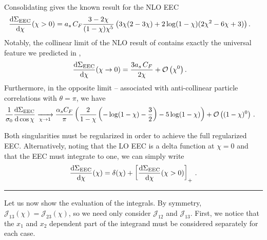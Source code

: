 Consolidating gives the known result for the NLO EEC \cite{Basham:1978bw}
\begin{align}
    \label{eq:ee_to_hadrons_eec_nlo}
    \frac{\dd\Sigma_\text{EEC}}{\dd\chi}(\chi>0)
    &=
    \ascf
    \frac{3-2\chi}{(1-\chi)\chi^5}
    \le(
        3 \chi (2 - 3 \chi)
        +
        2 \log(1 - \chi) (2 \chi^2 - 6 \chi + 3)
    \ri)
    .
\end{align}
%
Notably, the collinear limit of the NLO result of  contains exactly the universal feature we predicted in ,
\begin{align}
    \frac{\dd\Sigma_\text{EEC}}{\dd\chi}(\chi\to 0)
    &=
    \frac{3a_s \, C_F}{2\chi}
    +
    \mathcal O\left(\chi^0\right)
    .
\end{align}
%
Furthermore, in the opposite limit -- associated with anti-collinear particle correlations with \(\theta = \pi\), we have
\begin{align}
    \frac{1}{\sigma_0}
    \dv{\Sigma_\text{EEC}}{\cos\chi}{}
    &\xrightarrow[\chi\to 1]{}
    \frac{\alpha_s C_F}{\pi}
    \left(
        \frac{2}{1-\chi}
        \left(
            -\log(1-\chi)
            -\frac{3}{2}
        \right)
        - 5 \log(1-\chi)
    \right)
    + \mathcal O\left((1-\chi)^0\right)
    \,.
\end{align}

Both singularities must be regularized in order to achieve the full regularized EEC.
%
Alternatively, noting that the LO EEC is a delta function at \(\chi = 0\) and that the EEC must integrate to one, we can simply write
\begin{align}
    \frac{\dd \Sigma_\text{EEC}}{\dd \chi}(\chi)
    =
    \delta(\chi)
    +
    \left[
    \frac{\dd \Sigma_\text{EEC}}{\dd \chi}(\chi > 0)
    \right]_+
    \,.
\end{align}




\vspace{12pt}
\hrule
\vspace{12pt}

Let us now show the evaluation of the integrals.
%
By symmetry, \(\mathcal{J}_{13}(\chi) = \mathcal{J}_{23}(\chi)\), so we need only consider \(\mathcal{J}_{12}\) and \(\mathcal{J}_{13}\).
%
First, we notice that the \(x_1\) and \(x_2\) dependent part of the integrand must be considered separately for each case.

